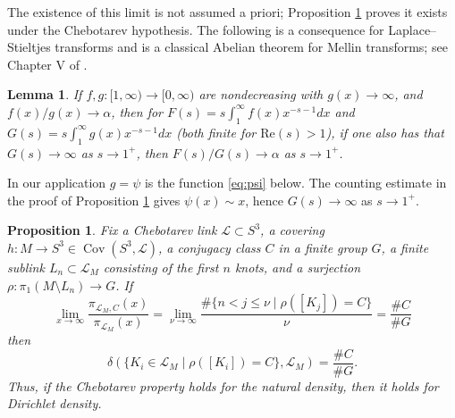 \documentclass{amsart}
\theoremstyle{plain}
\theoremstyle{definition}
\theoremstyle{plain}
\newtheorem{prop}[theorem]{Proposition}
\theoremstyle{plain}
\theoremstyle{plain}
\newtheorem{lemma}[theorem]{Lemma}
\theoremstyle{remark}
\theoremstyle{remark}
\theoremstyle{plain}
\theoremstyle{definition}
\theoremstyle{plain}
\DeclareMathOperator{\Cov}{\mathrm{Cov}}
\theoremstyle{plain}
\theoremstyle{plain}
\numberwithin{equation}{section}
\begin{document}
The existence of this limit is not assumed a priori; Proposition \ref{prop:densityequiv} proves it exists under the Chebotarev hypothesis. The following is a consequence for Laplace--Stieltjes transforms and is a classical Abelian theorem for Mellin transforms; see Chapter V of \cite{widder}.

\begin{lemma}\label{lma:calc}
If $f, g: [1, \infty) \to [0, \infty)$ are nondecreasing with $g(x) \to \infty$, and $f(x)/g(x) \to \alpha$, then for $F(s) = s\int_1^\infty f(x)x^{-s-1}dx$ and $G(s) = s\int_1^\infty g(x)x^{-s-1}dx$ (both finite for $\text{Re}(s) > 1$), if one also has that $G(s)\to \infty$ as $s \to 1^+$, then $F(s)/G(s) \to \alpha$ as $s \to 1^+$. 
\end{lemma}

In our application $g = \psi$ is the function \eqref{eq:psi} below. The counting estimate in the proof of Proposition \ref{prop:densityequiv} gives $\psi(x) \sim x$, hence $G(s) \to \infty$ as $s \to 1^+$.

\begin{prop}\label{prop:densityequiv}
Fix a Chebotarev link $\mathcal{L} \subset S^3$, a covering $h: M \to S^3 \in \Cov(S^3, \mathcal{L})$, a conjugacy class $C$ in a finite group $G$, a finite sublink $L_n \subset \mathcal{L}_M$ consisting of the first $n$ knots, and a surjection $\rho: \pi_1(M \setminus L_n) \to G$. If 
\begin{equation}
    \lim_{x \to \infty}\frac{\pi_{\mathcal{L}_M, C}(x)}{\pi_{\mathcal{L}_M}(x)} = \lim_{\nu \to \infty}\frac{\#\{n < j \leq \nu \mid \rho([K_j]) = C\}}{\nu} = \frac{\#C}{\#G}
\end{equation}
then 
\begin{equation}
    \delta(\{K_i \in \mathcal{L}_M \mid \rho([K_i]) = C\}, \mathcal{L}_M) = \frac{\#C}{\#G}.
\end{equation}
Thus, if the Chebotarev property holds for the natural density, then it holds for Dirichlet density.
\end{prop}
\end{document}
